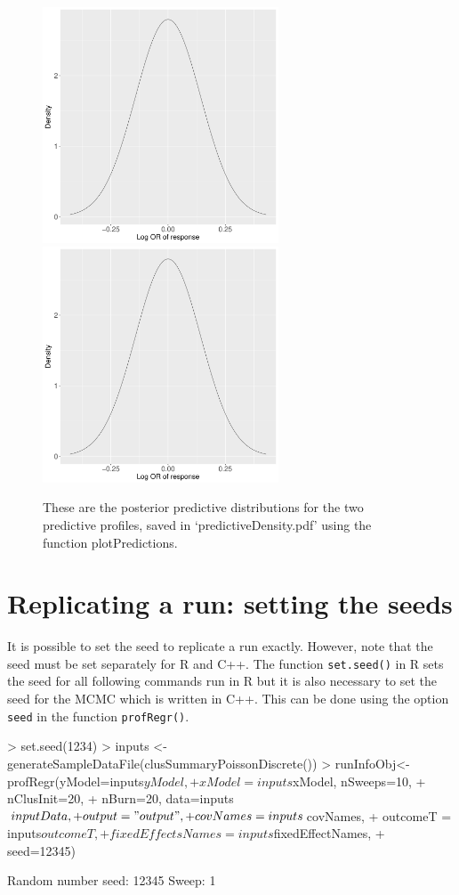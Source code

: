\documentclass{article}
\begin{document}
\begin{figure}[ht]
\centering
\includegraphics[height=7cm,page=1]{"predictiveDensity"}
\includegraphics[height=7cm,page=1]{"predictiveDensity"}
\caption{These are the posterior predictive distributions for the two predictive profiles, saved in `predictiveDensity.pdf' using the function plotPredictions.\label{fig:predict}}
\end{figure}

\section{Replicating a run: setting the seeds}
It is possible to set the seed to replicate a run exactly. However, note that the seed must be set separately for R and C++. The function \verb|set.seed()| in R sets the seed for all following commands run in R but it is also necessary to set the seed for the MCMC which is written in C++. This can be done using the option \verb|seed| in the function \verb|profRegr()|.
\begin{Schunk}
\begin{Sinput}
> set.seed(1234)
> inputs <- generateSampleDataFile(clusSummaryPoissonDiscrete())
> runInfoObj<-profRegr(yModel=inputs$yModel, 
+                      xModel=inputs$xModel, nSweeps=10, 
+                      nClusInit=20,
+                      nBurn=20, data=inputs$inputData, 
+                      output="output", 
+                      covNames = inputs$covNames, 
+                      outcomeT = inputs$outcomeT,
+                      fixedEffectsNames = inputs$fixedEffectNames,
+                      seed=12345)
\end{Sinput}
\begin{Soutput}
Random number seed: 12345
Sweep: 1
\end{Soutput}
\end{Schunk}
\end{document}
